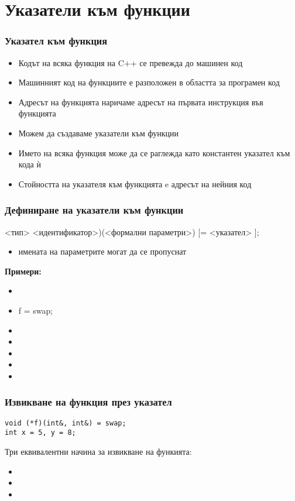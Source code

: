 \documentclass{beamer}
\begin{document}
\section{Указатели към функции}

\begin{frame}
  \frametitle{Указател към функция}

  \begin{itemize}[<+->]
  \item Кодът на всяка функция на C++ се превежда до машинен код
  \item Машинният код на функциите е разположен в областта за програмен код
  \item \alert{Адресът на функцията} наричаме адресът на първата инструкция във функцията
  \item Можем да създаваме \alert{указатели към функции}
  \item Името на всяка функция може да се раглежда като константен указател към кода ѝ
  \item Стойността на указателя към функцията e адресът на нейния код
  \end{itemize}
\end{frame}

\begin{frame}
  \frametitle{Дефиниране на указатели към функции}

  {\small
    <тип> \tta{(*}<идентификатор>\tta)\tta(<формални параметри>\tta) [\tta= <указател> ]\tta;}
  \pause
  \begin{itemize}
  \item имената на параметрите могат да се пропуснат
  \end{itemize}
  \pause
  \textbf{Примери:}
  \begin{itemize}[<+->]
  \item {}
  \item f = swap;
  \item {}
  \item {}
  \item {}
  \item {}
  \item {}
  \end{itemize}
\end{frame}

\begin{frame}[fragile]
  \frametitle{Извикване на функция през указател}

\begin{lstlisting}
void (*f)(int&, int&) = swap;
int x = 5, y = 8;
\end{lstlisting}
  \pause
  Три еквивалентни начина за извикване на функията:
  \begin{itemize}
  \item {}
  \item {}
  \item {}
  \end{itemize}
\end{frame}
\end{document}
